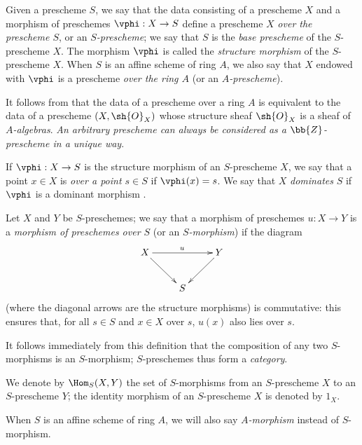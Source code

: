 \begin{definition}[2.5.1]
\label{I.2.5.1}
Given a prescheme $S$, we say that the data consisting of a prescheme $X$ and a morphism of preschemes $\vphi:X\to S$ define a prescheme $X$ \emph{over the prescheme $S$}, or an \emph{$S$-prescheme};
we say that $S$ is the \emph{base prescheme} of the $S$-prescheme $X$.
The morphism $\vphi$ is called the \emph{structure morphism} of the $S$-prescheme $X$.
When $S$ is an affine scheme of ring $A$, we also say that $X$ endowed with $\vphi$ is a prescheme \emph{over the ring $A$} (or an \emph{$A$-prescheme}).
\end{definition}

It follows from  that the data of a prescheme over a ring $A$ is equivalent to the data of a prescheme $(X,\sh{O}_X)$ whose structure sheaf $\sh{O}_X$ is a sheaf of \emph{$A$-algebras}.
\emph{An arbitrary prescheme can always be considered as a $\bb{Z}$-prescheme in a unique way}.

If $\vphi:X\to S$ is the structure morphism of an $S$-prescheme $X$, we
say that a point $x\in X$ is \emph{over a point $s\in S$} if $\vphi(x)=s$. We
say that $X$ \emph{dominates} $S$ if $\vphi$ is a dominant morphism .

\begin{env}[2.5.2]
\label{I.2.5.2}
Let $X$ and $Y$ be $S$-preschemes;
we say that a morphism of preschemes $u:X\to Y$ is a \emph{morphism of preschemes over $S$} (or an \emph{$S$-morphism}) if the diagram
\[
  \xymatrix{
    X \ar[rr]^u \ar[dr] & & Y\ar[dl]\\
    & S &
  }
\]
(where the diagonal arrows are the structure morphisms) is commutative: this ensures that, for all $s\in S$ and $x\in X$ over $s$, $u(x)$ also lies over $s$.
\end{env}

It follows immediately from this definition that the composition of any two $S$-morphisms is an $S$-morphism;
$S$-preschemes thus form a \emph{category}.

We denote by $\Hom_S(X,Y)$ the set of $S$-morphisms from an $S$-prescheme $X$ to an $S$-prescheme $Y$;
the identity morphism of an $S$-prescheme $X$ is denoted by $1_X$.

When $S$ is an affine scheme of ring $A$, we will also say \emph{$A$-morphism} instead of $S$-morphism.

